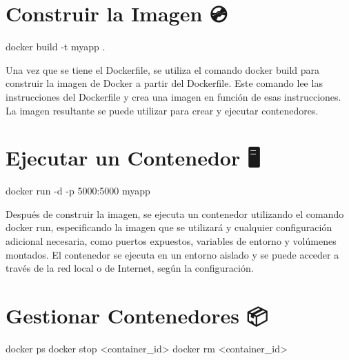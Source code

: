 \documentclass[
  a4paper,
  DIV=11,
  numbers=noendperiod,
  onepage,
  openany]{scrreprt}
\newenvironment{Shaded}{\begin{snugshade}}{\end{snugshade}}
\newcommand{\AttributeTok}[1]{\textcolor[rgb]{0.40,0.45,0.13}{#1}}
\newcommand{\ExtensionTok}[1]{\textcolor[rgb]{0.00,0.23,0.31}{#1}}
\newcommand{\NormalTok}[1]{\textcolor[rgb]{0.00,0.23,0.31}{#1}}
\newcommand{\OperatorTok}[1]{\textcolor[rgb]{0.37,0.37,0.37}{#1}}
\begin{document}
\section{Construir la Imagen 💿}\label{construir-la-imagen}

\begin{Shaded}
\begin{Highlighting}[]
\ExtensionTok{docker}\NormalTok{ build }\AttributeTok{{-}t}\NormalTok{ myapp .}
\end{Highlighting}
\end{Shaded}

Una vez que se tiene el Dockerfile, se utiliza el comando docker build
para construir la imagen de Docker a partir del Dockerfile. Este comando
lee las instrucciones del Dockerfile y crea una imagen en función de
esas instrucciones. La imagen resultante se puede utilizar para crear y
ejecutar contenedores.

\section{Ejecutar un Contenedor 🖥️}\label{ejecutar-un-contenedor}

\begin{Shaded}
\begin{Highlighting}[]
\ExtensionTok{docker}\NormalTok{ run }\AttributeTok{{-}d} \AttributeTok{{-}p}\NormalTok{ 5000:5000 myapp}
\end{Highlighting}
\end{Shaded}

Después de construir la imagen, se ejecuta un contenedor utilizando el
comando docker run, especificando la imagen que se utilizará y cualquier
configuración adicional necesaria, como puertos expuestos, variables de
entorno y volúmenes montados. El contenedor se ejecuta en un entorno
aislado y se puede acceder a través de la red local o de Internet, según
la configuración.

\section{Gestionar Contenedores 📦}\label{gestionar-contenedores}

\begin{Shaded}
\begin{Highlighting}[]
\ExtensionTok{docker}\NormalTok{ ps}
\ExtensionTok{docker}\NormalTok{ stop }\OperatorTok{\textless{}}\NormalTok{container\_id}\OperatorTok{\textgreater{}}
\ExtensionTok{docker}\NormalTok{ rm }\OperatorTok{\textless{}}\NormalTok{container\_id}\OperatorTok{\textgreater{}}
\end{Highlighting}
\end{Shaded}
\end{document}
